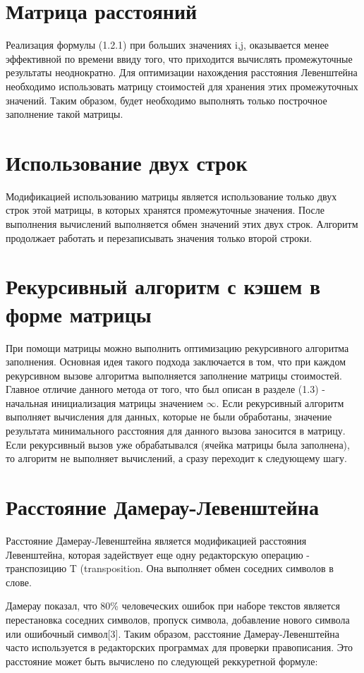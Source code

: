 \section{Матрица расстояний}
Реализация формулы (1.2.1) при больших значениях i,j, оказывается менее эффективной по времени ввиду того, что приходится вычислять промежуточные результаты неоднократно. Для оптимизации нахождения расстояния Левенштейна необходимо использовать матрицу стоимостей для хранения этих промежуточных значений. Таким образом, будет необходимо выполнять только построчное заполнение такой матрицы.

\section{Использование двух строк}
Модификацией использованию матрицы является использование только двух строк этой матрицы, в которых хранятся промежуточные значения. После выполнения вычислений выполняется обмен значений этих двух строк. Алгоритм продолжает работать и перезаписывать значения только второй строки.

\section{Рекурсивный алгоритм с кэшем в форме матрицы}
При помощи матрицы можно выполнить оптимизацию рекурсивного алгоритма заполнения. Основная идея такого подхода заключается в том, что при каждом рекурсивном вызове алгоритма выполняется заполнение матрицы стоимостей. Главное отличие данного метода от того, что был описан в разделе (1.3) - начальная инициализация матрицы значением $\infty$. Если рекурсивный алгоритм выполняет вычисления для данных, которые не были обработаны, значение результата минимального расстояния для данного вызова заносится в матрицу. Если рекурсивный вызов уже обрабатывался (ячейка матрицы была заполнена), то алгоритм не выполняет вычислений, а сразу переходит к следующему шагу.

\section{Расстояние Дамерау-Левенштейна}
Расстояние Дамерау-Левенштейна является модификацией расстояния Левенштейна, которая задействует еще одну редакторскую операцию - транспозицию T
(transposition. Она выполняет обмен соседних символов в слове.

Дамерау показал, что 80\% человеческих ошибок при наборе текстов является перестановка соседних символов, пропуск символа, добавление нового символа или ошибочный символ[3]. Таким образом, расстояние Дамерау-Левенштейна часто используется в редакторских программах для проверки правописания.
Это расстояние может быть вычислено по следующей реккуретной формуле:

